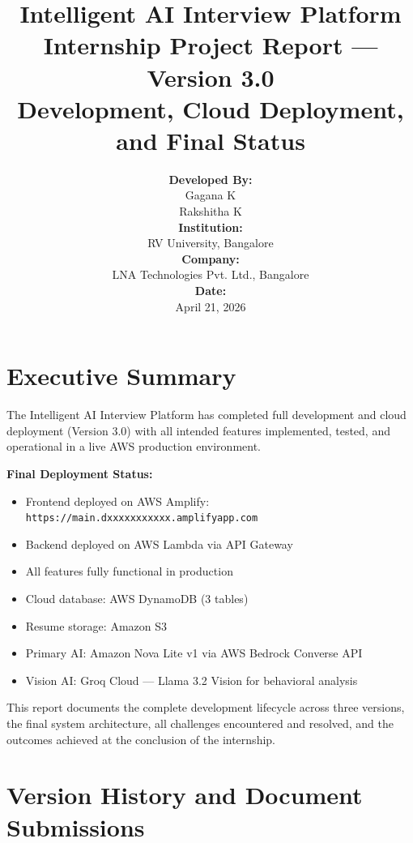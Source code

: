 \documentclass[12pt,a4paper]{article}
\title{
    \vspace*{2cm}
    \Huge\textbf{Intelligent AI Interview Platform}\\
    \LARGE{Internship Project Report --- Version 3.0}\\
    \vspace{1cm}
    \large{Development, Cloud Deployment, and Final Status}
    \vspace{2cm}
}
\author{
    \textbf{Developed By:}\\
    Gagana K\\
    Rakshitha K\\
    \vspace{1cm}
    \textbf{Institution:}\\
    RV University, Bangalore\\
    \vspace{0.5cm}
    \textbf{Company:}\\
    LNA Technologies Pvt. Ltd., Bangalore\\
    \vspace{1cm}
    \textbf{Date:}\\
    April 21, 2026
}
\date{}
\begin{document}
\maketitle
\thispagestyle{empty}
\newpage

\tableofcontents
\newpage

\section{Executive Summary}

The Intelligent AI Interview Platform has completed full development and cloud deployment (Version 3.0) with all intended features implemented, tested, and operational in a live AWS production environment.

\textbf{Final Deployment Status:}
\begin{itemize}[leftmargin=*]
    \item Frontend deployed on AWS Amplify: \texttt{https://main.dxxxxxxxxxxx.amplifyapp.com}
    \item Backend deployed on AWS Lambda via API Gateway
    \item All features fully functional in production
    \item Cloud database: AWS DynamoDB (3 tables)
    \item Resume storage: Amazon S3
    \item Primary AI: Amazon Nova Lite v1 via AWS Bedrock Converse API
    \item Vision AI: Groq Cloud --- Llama 3.2 Vision for behavioral analysis
\end{itemize}

This report documents the complete development lifecycle across three versions, the final system architecture, all challenges encountered and resolved, and the outcomes achieved at the conclusion of the internship.

\newpage

\section{Version History and Document Submissions}
\end{document}
